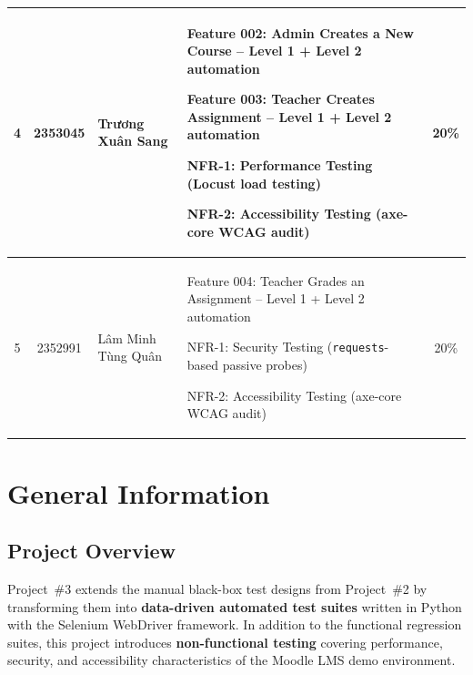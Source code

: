 \documentclass[twoside,final]{hcmut-report}
\begin{document}
\begin{table}[ht]
\begin{tabularx}{\textwidth}{|c|c|p{2.5cm}|>{\raggedright\arraybackslash}X|c|}
    4 & 2353045 & Trương Xuân Sang &
    \begin{filelist}
       \item Feature 002: Admin Creates a New Course -- Level 1 + Level 2 automation
       \item Feature 003: Teacher Creates Assignment -- Level 1 + Level 2 automation
       \item NFR-1: Performance Testing (Locust load testing)
       \item NFR-2: Accessibility Testing (axe-core WCAG audit)
    \end{filelist} & 20\% \\ \hline

    5 & 2352991 & Lâm Minh Tùng Quân &
    \begin{filelist}
       \item Feature 004: Teacher Grades an Assignment -- Level 1 + Level 2 automation
       \item NFR-1: Security Testing (\texttt{requests}-based passive probes)
       \item NFR-2: Accessibility Testing (axe-core WCAG audit)
    \end{filelist} & 20\% \\ \hline

    \end{tabularx}
\end{table}
\newpage

\section{General Information}

\subsection{Project Overview}
Project~\#3 extends the manual black-box test designs from Project~\#2 by transforming them into \textbf{data-driven automated test suites} written in Python with the Selenium WebDriver framework. In addition to the functional regression suites, this project introduces \textbf{non-functional testing} covering performance, security, and accessibility characteristics of the Moodle LMS demo environment.
\end{document}
